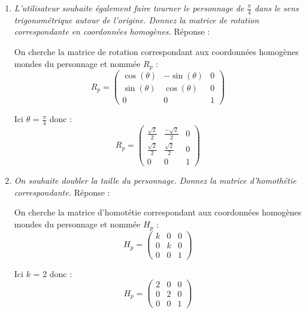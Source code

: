 \documentclass[a4paper,12pt]{article}
\begin{document}
\begin{enumerate}
    \item \emph{L'utilisateur souhaite également faire tourner le personnage de \(\frac{\pi}{4}\) dans le sens trigonométrique autour de l'origine. Donnez la matrice de rotation correspondante en coordonnées homogènes.} \label{exo:1.2}\newline \newline
Réponse :

On cherche la matrice de rotation correspondant aux coordonnées homogènes mondes du personnage et nommée $R_p$ : 
 \begin{equation}
R_p = 
\begin{pmatrix}
\cos(\theta) & -\sin(\theta) & 0 \\
\sin(\theta) & \cos(\theta) & 0 \\
0 & 0 & 1
\end{pmatrix} \end{equation}

Ici \(\theta\) = \(\frac{\pi}{4}\) donc : \newline
 \begin{equation}\boxed{
R_p = 
\begin{pmatrix}
\frac{\sqrt{2}}{2} & \frac{-\sqrt{2}}{2} & 0 \\
\frac{\sqrt{2}}{2} & \frac{\sqrt{2}}{2} & 0 \\
0 & 0 & 1
\end{pmatrix}} \end{equation} \newline
    \item \emph{On souhaite doubler la taille du personnage. Donnez la matrice d'homothétie correspondante.}\newline \newline
Réponse :

On cherche la matrice d'homotétie correspondant aux coordonnées homogènes mondes du personnage et nommée $H_p$ : 
 \begin{equation}
H_p = 
\begin{pmatrix}
k & 0 & 0 \\
0 & k & 0 \\
0 & 0 & 1
\end{pmatrix} \end{equation}

Ici $k$ = 2 donc : 
 \begin{equation}\boxed{
H_p = 
\begin{pmatrix}
2 & 0 & 0 \\
0 & 2 & 0 \\
0 & 0 & 1
\end{pmatrix}} \end{equation} \newline


\end{enumerate}
\end{document}
